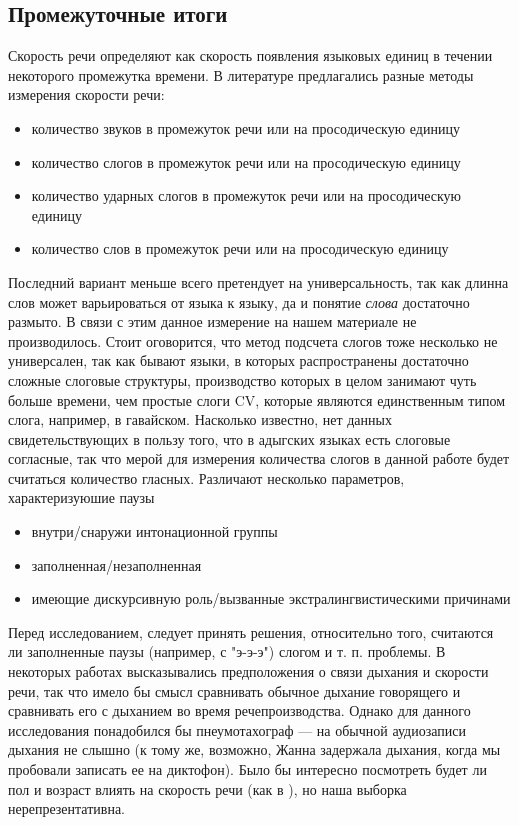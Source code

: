 \subsection{Промежуточные итоги}
\begin{itemize}
\mytem Скорость речи определяют как скорость появления языковых единиц в течении некоторого промежутка времени. В литературе предлагались разные методы измерения скорости речи:
\begin{itemize}
\item количество звуков в промежуток речи или на просодическую единицу
\item количество слогов в промежуток речи или на просодическую единицу
\item количество ударных слогов в промежуток речи или на просодическую единицу
\item количество слов в промежуток речи или на просодическую единицу
\end{itemize}
Последний вариант меньше всего претендует на универсальность, так как длинна слов может варьироваться от языка к языку, да и понятие \textit{слова} достаточно размыто. В связи с этим данное измерение на нашем материале не производилось. Стоит оговорится, что метод подсчета слогов тоже несколько не универсален, так как бывают языки, в которых распространены достаточно сложные слоговые структуры, производство которых в целом занимают чуть больше времени, чем простые слоги CV, которые являются единственным типом слога, например, в гавайском.
\mytem Насколько известно, нет данных свидетельствующих в пользу того, что в адыгских языках есть слоговые согласные, так что мерой для измерения количества слогов в данной работе будет считаться количество гласных.
\mytem Различают несколько параметров, характеризуюшие паузы
\begin{itemize}
\item внутри/снаружи интонационной группы
\item заполненная/незаполненная
\item имеющие дискурсивную роль/вызванные экстралингвистическими причинами
\end{itemize}
Перед исследованием, следует принять решения, относительно того, считаются ли заполненные паузы (например, с "э-э-э") слогом и т. п. проблемы.
\mytem В некоторых работах высказывались предположения о связи дыхания и скорости речи, так что имело бы смысл сравнивать обычное дыхание говорящего и сравнивать его с дыханием во время речепроизводства. Однако для данного исследования понадобился бы пнеумотахограф --- на обычной  аудиозаписи дыхания не слышно (к тому же, возможно, Жанна задержала дыхания, когда мы пробовали записать ее на диктофон).
\mytem Было бы интересно посмотреть будет ли пол и возраст влиять на скорость речи (как в \citep{stepanova11}), но наша выборка нерепрезентативна.
\end{itemize}
